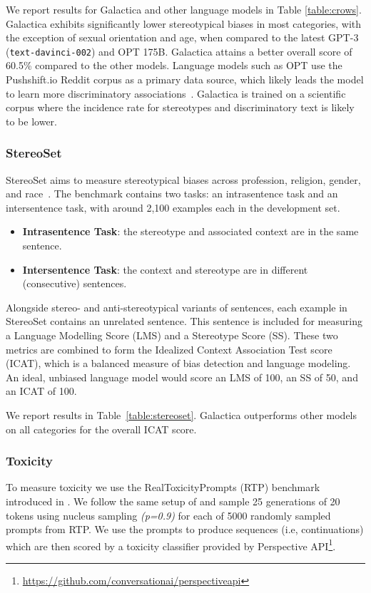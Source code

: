 {We report results for Galactica and other language models in Table \ref{table:crows}. Galactica exhibits significantly lower stereotypical biases in most categories, with the exception of sexual orientation and age, when compared to the latest GPT-3 (\verb|text-davinci-002|) and OPT 175B. Galactica attains a better overall score of 60.5\% compared to the other models. Language models such as OPT use the Pushshift.io Reddit corpus as a primary data source, which likely leads the model to learn more discriminatory associations~\citep{OPT}. Galactica is trained on a scientific corpus where the incidence rate for stereotypes and discriminatory text is likely to be lower.

\subsubsection{StereoSet}

StereoSet aims to measure stereotypical biases across profession, religion, gender, and race~\citep{stereoset}. The benchmark contains two tasks: an intrasentence task and an intersentence task, with around 2,100 examples each in the development set.

\begin{itemize}
    \item \textbf{Intrasentence Task}: the stereotype and associated context are in the same sentence.
    \item \textbf{Intersentence Task}: the context and stereotype are in different (consecutive) sentences.
\end{itemize}

Alongside stereo- and anti-stereotypical variants of sentences, each example in StereoSet contains an unrelated sentence. This sentence is included for measuring a Language Modelling Score (LMS) and a Stereotype Score (SS). These two metrics are combined to form the Idealized Context Association Test score (ICAT), which is a balanced measure of bias detection and language modeling. An ideal, unbiased language model would score an LMS of 100, an SS of 50, and an ICAT of 100.

We report results in Table~\ref{table:stereoset}. Galactica outperforms other models on all categories for the overall ICAT score.

\subsubsection{Toxicity}

To measure toxicity we use the RealToxicityPrompts (RTP) benchmark introduced in \citet{RealToxicityPrompts}. We follow the same setup of \cite{OPT} and sample 25 generations of 20 tokens using nucleus sampling \textit{(p=0.9)} for each of 5000 randomly sampled prompts from RTP. We use the prompts to produce sequences (i.e, continuations) which are then scored by a toxicity classifier provided by Perspective API\footnote{\url{https://github.com/conversationai/perspectiveapi}}.

}
